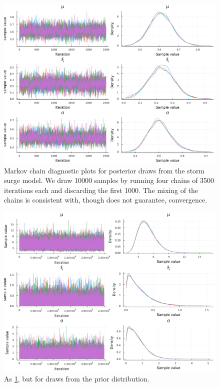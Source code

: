 \documentclass[ef,draft]{agutexSI2019}
\begin{document}
\begin{figure}
      \centering
      \includegraphics[width=\textwidth]{surge-posterior-chains}
      \caption{
            Markov chain diagnostic plots for posterior draws from the storm surge model.
            We draw \num{10000} samples by running four chains of \num{3500} iterations each and discarding the first \num{1000}.
            The mixing of the chains is consistent with, though does not guarantee, convergence.
      }\label{fig:surge-posterior-chains}
\end{figure}

\begin{figure}
      \centering
      \includegraphics[width=\textwidth]{surge-prior-chains}
      \caption{
            As \cref{fig:surge-posterior-chains}, but for draws from the prior distribution.
      }\label{fig:surge-prior-chains}
\end{figure}
\end{document}
